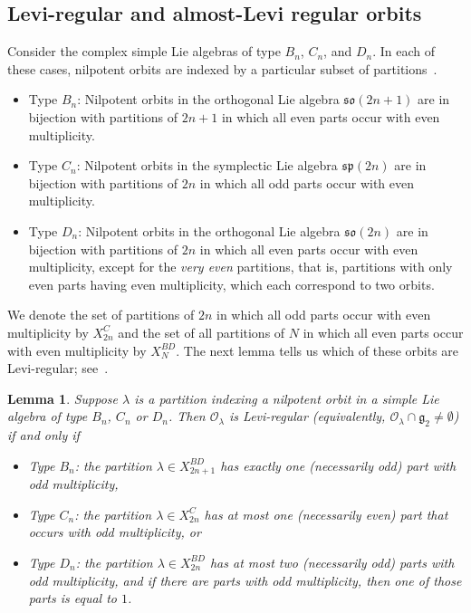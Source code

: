 \documentclass[reqno,11pt]{amsart}
\newtheorem{Lem}[Thm]{Lemma}
\theoremstyle{remark}
\theoremstyle{remark}
\theoremstyle{definition}
\theoremstyle{definition}
\theoremstyle{definition}
\numberwithin{equation}{section}
\newcommand{\fg}{{\mathfrak g}}
\newcommand{\co}{\mathcal{O}}
\begin{document}
\subsection{Levi-regular and almost-Levi regular orbits} \label{ss.g2}
Consider the complex simple Lie algebras of type $B_n$, $C_n$, and $D_n$. In each of these cases, nilpotent orbits are indexed by a particular subset of partitions~\cite[\S 5.1]{NilOrbBk}. 
\begin{itemize}
\item Type $B_n$: Nilpotent orbits in the orthogonal Lie algebra $\mathfrak{so}(2n+1)$ are in bijection with partitions of $2n+1$ in which all even parts occur with even multiplicity.
\item Type $C_n$: Nilpotent orbits in the symplectic Lie algebra $\mathfrak{sp}(2n)$ are in bijection with partitions of $2n$ in which all odd parts occur with even multiplicity.
\item Type $D_n$: Nilpotent orbits in the orthogonal Lie algebra $\mathfrak{so}(2n)$ are in bijection with partitions of $2n$ in which all even parts occur with even multiplicity, except for the \emph{very even} partitions, that is, partitions with only even parts having even multiplicity, which each correspond to two orbits.
\end{itemize}
We denote the set of partitions of $2n$ in which all odd parts occur with even multiplicity by $X_{2n}^C$ and the set of all partitions of $N$ in which all even parts occur with even multiplicity by $X_N^{BD}$.
The next lemma tells us which of these orbits are Levi-regular; see~\cite[Prop.~3.1]{Russell}. 



\begin{Lem} \label{lem.g2orbits} Suppose $\lambda$ is a partition indexing a nilpotent orbit in a simple Lie algebra of type $B_n$, $C_n$ or $D_n$.  Then 
$\co_{\lambda}$ is Levi-regular (equivalently, $\co_\lambda \cap \fg_2\neq \emptyset$) if and only if
\begin{itemize}
\item \textup{Type $B_n$:} the partition $\lambda \in X_{2n+1}^{BD}$ has exactly one (necessarily odd) part with odd multiplicity,
\item \textup{Type $C_n$:} the partition $\lambda\in X_{2n}^C$ has at most one (necessarily even) part that occurs with odd multiplicity, or
\item \textup{Type $D_n$:} the partition $\lambda \in X_{2n}^{BD}$ has at most two (necessarily odd) parts with odd multiplicity, and if there are parts with odd multiplicity,
then one of those parts is equal to $1$.
\end{itemize} 
\end{Lem} 
\end{document}
